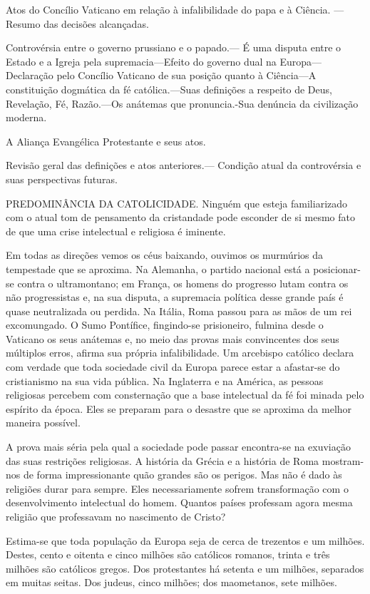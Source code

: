 \documentclass[11pt,a5paper,twoside,openany]{book}
\begin{document}
Atos do Concílio Vaticano em relação à infalibilidade do papa e à Ciência. — Resumo das decisões alcançadas.

Controvérsia entre o governo prussiano e o papado.— É uma disputa entre o Estado e a Igreja pela supremacia—Efeito do governo dual na Europa—Declaração pelo Concílio Vaticano de sua posição quanto à Ciência—A constituição dogmática da fé católica.—Suas definições a respeito de Deus, Revelação, Fé, Razão.—Os anátemas que pronuncia.-Sua denúncia da civilização moderna.

A Aliança Evangélica Protestante e seus atos.

Revisão geral das definições e atos anteriores.— Condição atual da controvérsia e suas perspectivas futuras.

PREDOMINÂNCIA DA CATOLICIDADE. Ninguém que esteja familiarizado com o atual tom de pensamento da cristandade pode esconder de si mesmo fato de que uma crise intelectual e religiosa é iminente.

Em todas as direções vemos os céus baixando, ouvimos os murmúrios da tempestade que se aproxima. Na Alemanha, o partido nacional está a posicionar-se contra o ultramontano; em França, os homens do progresso lutam contra os não progressistas e, na sua disputa, a supremacia política desse grande país é quase neutralizada ou perdida. Na Itália, Roma passou para as mãos de um rei excomungado. O Sumo Pontífice, fingindo-se prisioneiro, fulmina desde o Vaticano os seus anátemas e, no meio das provas mais convincentes dos seus múltiplos erros, afirma sua própria infalibilidade. Um arcebispo católico declara com verdade que toda sociedade civil da Europa parece estar a afastar-se do cristianismo na sua vida pública. Na Inglaterra e na América, as pessoas religiosas percebem com consternação que a base intelectual da fé foi minada pelo espírito da época. Eles se preparam para o desastre que se aproxima da melhor maneira possível.

A prova mais séria pela qual a sociedade pode passar encontra-se na exuviação das suas restrições religiosas. A história da Grécia e a história de Roma mostram-nos de forma impressionante quão grandes são os perigos. Mas não é dado às religiões durar para sempre. Eles necessariamente sofrem transformação com o desenvolvimento intelectual do homem. Quantos países professam agora mesma religião que professavam no nascimento de Cristo?

Estima-se que toda população da Europa seja de cerca de trezentos e um milhões. Destes, cento e oitenta e cinco milhões são católicos romanos, trinta e três milhões são católicos gregos. Dos protestantes há setenta e um milhões, separados em muitas seitas. Dos judeus, cinco milhões; dos maometanos, sete milhões.
\end{document}
